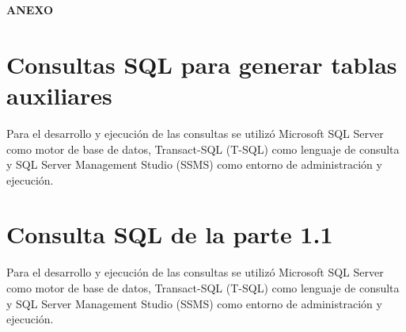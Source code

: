 \documentclass[12pt,a4paper]{article}
\begin{document}
	
	\newpage	
	\begin{center}
		\vspace*{10cm}
		{\Huge \textbf{ANEXO}}
	\end{center}
	\newpage 
	
	\appendix
	\section{Consultas SQL para generar tablas auxiliares}\label{anexo 1}
	
	    \noindent Para el desarrollo y ejecución de las consultas se utilizó Microsoft SQL Server como motor
		de base de datos, Transact-SQL (T-SQL) como lenguaje de consulta y SQL Server Management Studio (SSMS)
		como entorno de administración y ejecución.
		
		\begin{tcolorbox}[colback= main!40, colframe=main!40]
			
		\end{tcolorbox}
		\begin{tcolorbox}[colback= main!40, colframe=main!40]
			
		\end{tcolorbox}
		\begin{tcolorbox}[colback= main!40, colframe=main!40]
			
		\end{tcolorbox}
		\begin{tcolorbox}[colback= main!40, colframe=main!40]
			
		\end{tcolorbox}
	
	\section{Consulta SQL de la parte 1.1}\label{anexo 2}
		
		\noindent Para el desarrollo y ejecución de las consultas se utilizó Microsoft SQL Server como motor
		de base de datos, Transact-SQL (T-SQL) como lenguaje de consulta y SQL Server Management Studio (SSMS)
		como entorno de administración y ejecución.
		
\end{document}
